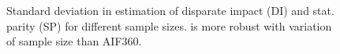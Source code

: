 \begin{figure}
	\centering
			\caption{Standard deviation in estimation of disparate impact (DI) and stat. parity (SP)  for different sample sizes. {\justicia} is more robust with variation of sample size than  AIF360. }
	\label{fairness_justicia_fig:sample-size}
\end{figure}



